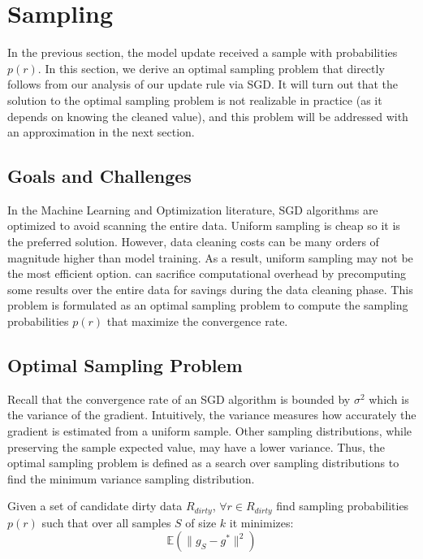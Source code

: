 \section{Sampling}\label{dist-samp}
In the previous section, the model update received a sample with probabilities $p(r)$.
In this section, we derive an optimal sampling problem that directly follows from our analysis of our update rule via SGD.
It will turn out that the solution to the optimal sampling problem is not realizable in practice (as it depends on knowing the cleaned value), and this problem will be addressed with an approximation in the next section.

\subsection{Goals and Challenges}
In the Machine Learning and Optimization literature, SGD algorithms are optimized to avoid scanning the entire data.
Uniform sampling is cheap so it is the preferred solution.
However, data cleaning costs can be many orders of magnitude higher than model training.
As a result, uniform sampling may not be the most efficient option.
\sys can sacrifice computational overhead by precomputing some results over the entire data for savings during the data cleaning phase.
This problem is formulated as an optimal sampling problem to compute the sampling probabilities $p(r)$ that maximize the convergence rate.

\subsection{Optimal Sampling Problem}
Recall that the convergence rate of an SGD algorithm is bounded by $\sigma^2$ which is the variance of the gradient.
Intuitively, the variance measures how accurately the gradient is estimated from a uniform sample.
Other sampling distributions, while preserving the sample expected value, may have a lower variance.
Thus, the optimal sampling problem is defined as a search over sampling distributions to find the minimum variance sampling distribution.

\begin{definition}
Given a set of candidate dirty data $R_{dirty}$, $\forall r \in R_{dirty}$ find sampling probabilities $p(r)$ such that over all samples $S$ of size $k$ it minimizes:
\[
\mathbb{E}(\|g_S - g^*\|^2)
\]
\end{definition}

